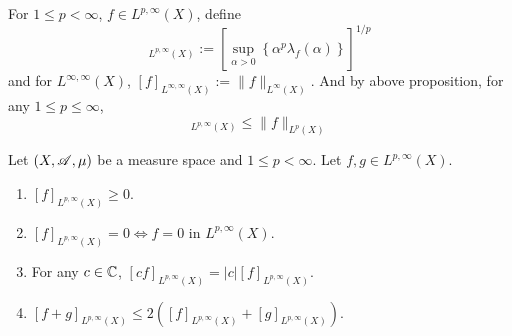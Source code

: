 \noindent For $1 \leq p < \infty$, $f \in L^{p,\infty}(X)$, define
\begin{equation*}
	[f]_{L^{p, \infty}(X)}:=\left[\sup _{\alpha>0}\left\{\alpha^p \lambda_f(\alpha)\right\}\right]^{1 / p}
\end{equation*}
and for $L^{\infty,\infty}(X)$, $[f]_{L^{\infty, \infty}(X)}:=\|f\|_{L^{\infty}(X)}$. And by above proposition, for any $1 \leq p \leq \infty$,
\begin{equation*}
	[f]_{L^{p, \infty}(X)} \leq\|f\|_{L^p(X)}
\end{equation*}

\begin{prop}
	Let $(X,\mathscr{A},\mu)$ be a measure space and $1 \leq p < \infty$. Let $f,g \in L^{p,\infty}(X)$.
	\begin{enumerate}[label=(\arabic{*})]
		\item $[f]_{L^{p, \infty}(X)} \geq 0$.
		\item $[f]_{L^{p, \infty}(X)}=0 \Leftrightarrow f=0$ in $L^{p,\infty}(X)$.
		\item For any $c \in \mathbb{C}$, $[c f]_{L^{p, \infty}(X)}=|c|[f]_{L^{p, \infty}(X)}$.
		\item $[f+g]_{L^{p, \infty}(X)} \leq 2\left([f]_{L^{p, \infty}(X)}+[g]_{L^{p, \infty}(X)}\right)$.
	\end{enumerate}
\end{prop}

